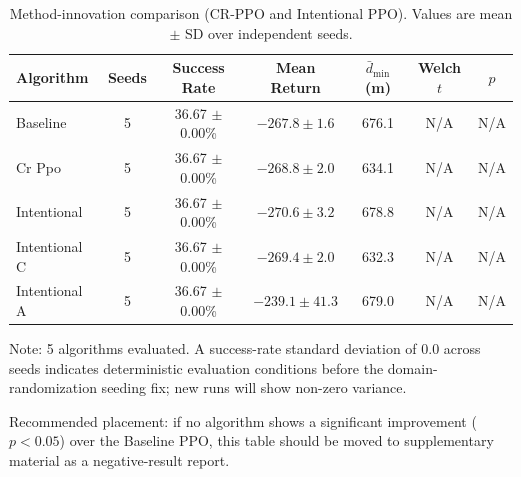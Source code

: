 \begin{table}[t]
\centering
\caption{Method-innovation comparison (CR-PPO and Intentional PPO). Values are mean $\pm$ SD over independent seeds.}
\label{tab:method_innovation_comparison}
\begin{tabular}{lcccccc}
\toprule
Algorithm & Seeds & Success Rate & Mean Return & $\bar{d}_{\min}$ (m) & Welch $t$ & $p$ \\
\midrule
Baseline & 5 & 36.67 $\pm$ 0.00\% & $-267.8 \pm 1.6$ & 676.1 & N/A & N/A \\
Cr Ppo & 5 & 36.67 $\pm$ 0.00\% & $-268.8 \pm 2.0$ & 634.1 & N/A & N/A \\
Intentional & 5 & 36.67 $\pm$ 0.00\% & $-270.6 \pm 3.2$ & 678.8 & N/A & N/A \\
Intentional C & 5 & 36.67 $\pm$ 0.00\% & $-269.4 \pm 2.0$ & 632.3 & N/A & N/A \\
Intentional A & 5 & 36.67 $\pm$ 0.00\% & $-239.1 \pm 41.3$ & 679.0 & N/A & N/A \\
\bottomrule
\end{tabular}
\begin{tablenotes}
\small
\item Note: 5 algorithms evaluated. A success-rate standard deviation of 0.0 across seeds indicates deterministic evaluation conditions before the domain-randomization seeding fix; new runs will show non-zero variance.
\item Recommended placement: if no algorithm shows a significant improvement ($p<0.05$) over the Baseline PPO, this table should be moved to supplementary material as a negative-result report.
\end{tablenotes}
\end{table}
